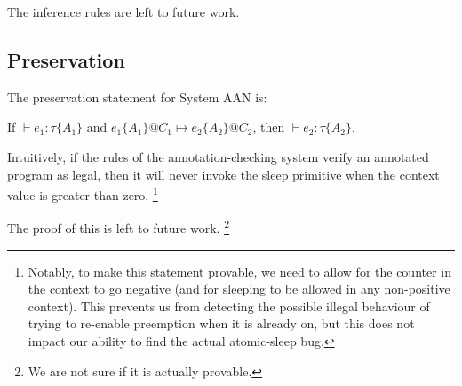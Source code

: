 \documentclass{article}
\begin{document}
The inference rules are left to future work.

\subsection{Preservation}

The preservation statement for System AAN is:

\begin{center}
	If $\vdash e_1 : \tau\{A_1\}$ and $e_1\{A_1\}@C_1 \mapsto e_2\{A_2\}@C_2$, then $\vdash e_2 : \tau\{A_2\}$.
\end{center}

Intuitively, if the rules of the annotation-checking system verify an annotated program as legal, then it will never invoke the {\sf sleep} primitive when the context value is greater than zero.
\footnote{Notably, to make this statement provable, we need to allow for the counter in the context to go negative (and for sleeping to be allowed in any non-positive context). This prevents us from detecting the possible illegal behaviour of trying to re-enable preemption when it is already on, but this does not impact our ability to find the actual atomic-sleep bug.}

The proof of this is left to future work.
\footnote{We are not sure if it is actually provable.}
\end{document}
